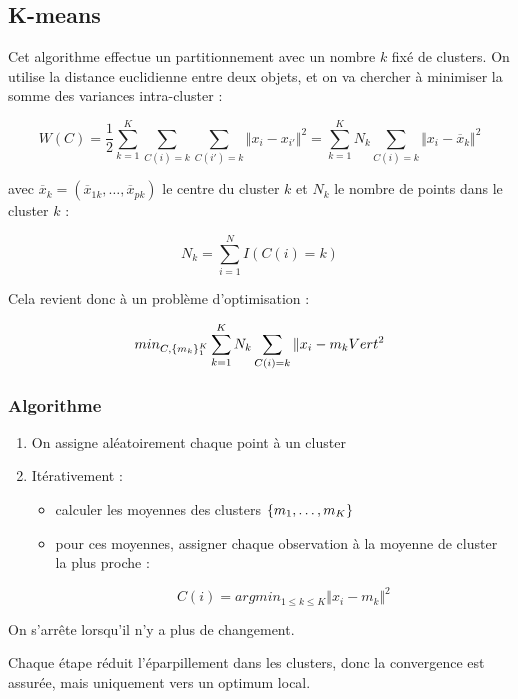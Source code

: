 	\subsection{K-means}
	
	Cet algorithme effectue un partitionnement avec un nombre $k$ fixé de clusters. On utilise la distance euclidienne entre deux objets, et on va chercher à minimiser la somme des variances intra-cluster :
	
	$$W(C) = \frac{1}{2} \sum_{k = 1}^K \sum_{C(i) = k} \sum_{C(i') = k} \Vert x_i - x_{i'} \Vert^2 = \sum_{k = 1}^K N_k \sum_{C(i) = k} \Vert x_i - \overline{x}_k \Vert^2$$
	
	avec $\overline{x}_k = (\overline{x}_{1k}, \dots, \overline{x}_{pk})$ le centre du cluster $k$ et $N_k$ le nombre de points dans le cluster $k$ :
	
	$$N_k = \sum_{i = 1}^N I(C(i) = k)$$
	
	Cela revient donc à un problème d'optimisation :
	
	$$min_{C, \lbrace m_k \rbrace^K_1} \sum_{k = 1}^K N_k \sum_{C(i) = k} \Vert x_i - m_k Vert^2$$
	
		\subsubsection{Algorithme}
		
		\begin{enumerate}
			\item On assigne aléatoirement chaque point à un cluster
			\item Itérativement :
			
			\begin{itemize}
				\item calculer les moyennes des clusters $\lbrace m_1 , \dots , m_K \rbrace$
				\item pour ces moyennes, assigner chaque observation à la moyenne de cluster la plus proche :
				
				$$C(i) = argmin_{1 \leq k \leq K} \Vert x_i - m_k \Vert^2$$
			\end{itemize}
		\end{enumerate}
		
		On s'arrête lorsqu'il n'y a plus de changement.
		
		
		
		
		Chaque étape réduit l'éparpillement dans les clusters, donc la convergence est assurée, mais uniquement vers un optimum local.
		
